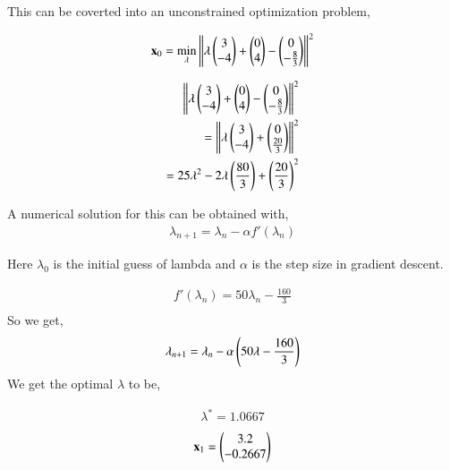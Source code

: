 \documentclass[journal,12pt,twocolumn]{IEEEtran}
\renewcommand\thesection{\arabic{section}}
\begin{document}
\begin{enumerate}
This can be coverted into an unconstrained optimization problem,
	
		\begin{align}
			\mathbf{x}_0 = \min_{\mathbf{\lambda}} \left\lVert\lambda \begin{pmatrix}3\\-4\end{pmatrix}+\begin{pmatrix}0\\4\end{pmatrix}-\begin{pmatrix}0\\-\frac{8}{3}\end{pmatrix}\right\rVert^2\\
		\end{align}

		\begin{align}
			\left\lVert\lambda \begin{pmatrix}3\\-4\end{pmatrix}+\begin{pmatrix}0\\4\end{pmatrix}-\begin{pmatrix}0\\-\frac{8}{3}\end{pmatrix}\right\rVert^2\\
			= \left\lVert\lambda \begin{pmatrix}3\\-4\end{pmatrix}+\begin{pmatrix}0\\\frac{20}{3}\end{pmatrix}\right\rVert^2\\
			= 25\lambda^2 -2\lambda \left(\frac{80}{3}\right)+\left(\frac{20}{3}\right)^2
		\end{align}

A numerical solution for this can be obtained with,
		\begin{align}
			\lambda_{n+1} = \lambda_n - \alpha f'(\lambda_n)
		\end{align}

Here $\lambda_0$ is the initial guess of lambda and $\alpha$ is the step size in gradient descent.

		\begin{align}
			f'(\lambda_n) = 50\lambda_n-\frac{160}{3}\\
		\end{align}
So we get,
		\begin{align}
			\lambda_{n+1} = \lambda_n - \alpha \left(50\lambda-\frac{160}{3}\right) 
		\end{align}
We get the optimal $\lambda$ to be,

		\begin{align}
			\lambda^* = 1.0667
		\end{align}
\begin{align}
	\mathbf{x}_1 = \begin{pmatrix}3.2\\-0.2667\end{pmatrix}
\end{align}
		\begin{table}[h]
			\centering
			
			\caption{}
			\label{tab:2}
		\end{table}

\end{enumerate}

%
\end{document}
